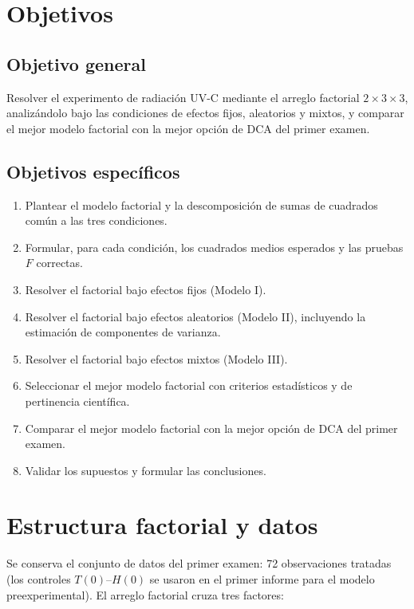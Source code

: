 \documentclass[12pt,a4paper]{article}
\begin{document}
\section{Objetivos}

\subsection{Objetivo general}

Resolver el experimento de radiación UV-C mediante el arreglo factorial $2\times3\times3$, analizándolo bajo las condiciones de efectos fijos, aleatorios y mixtos, y comparar el mejor modelo factorial con la mejor opción de DCA del primer examen.

\subsection{Objetivos específicos}

\begin{enumerate}[label=\alph*)]
    \item Plantear el modelo factorial y la descomposición de sumas de cuadrados común a las tres condiciones.
    \item Formular, para cada condición, los cuadrados medios esperados y las pruebas $F$ correctas.
    \item Resolver el factorial bajo efectos fijos (Modelo I).
    \item Resolver el factorial bajo efectos aleatorios (Modelo II), incluyendo la estimación de componentes de varianza.
    \item Resolver el factorial bajo efectos mixtos (Modelo III).
    \item Seleccionar el mejor modelo factorial con criterios estadísticos y de pertinencia científica.
    \item Comparar el mejor modelo factorial con la mejor opción de DCA del primer examen.
    \item Validar los supuestos y formular las conclusiones.
\end{enumerate}

\section{Estructura factorial y datos}

Se conserva el conjunto de datos del primer examen: 72 observaciones tratadas (los controles $T(0)$--$H(0)$ se usaron en el primer informe para el modelo preexperimental). El arreglo factorial cruza tres factores:
\end{document}
